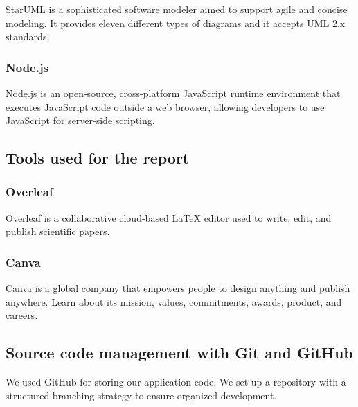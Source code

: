 StarUML \cite{StarUMLWebsite} is a sophisticated software modeler aimed to support agile and concise modeling. It provides eleven different types of diagrams and it accepts UML 2.x standards.

\subsubsection*{\protect{} Node.js}

Node.js \cite{NodeJSWebsite} is an open-source, cross-platform JavaScript runtime environment that executes JavaScript code outside a web browser, allowing developers to use JavaScript for server-side scripting.

\subsection{Tools used for the report}

\subsubsection*{\protect{} Overleaf}

Overleaf is a collaborative cloud-based LaTeX editor used to write, edit, and publish scientific papers.

\subsubsection*{\protect{} Canva}

Canva is a global company that empowers people to design anything and publish anywhere. Learn about its mission, values, commitments, awards, product, and careers.

\subsection{Source code management with Git and GitHub}

We used GitHub \cite{GithubWebsite} for storing our application code. We set up a repository with a structured branching strategy to ensure organized development.

